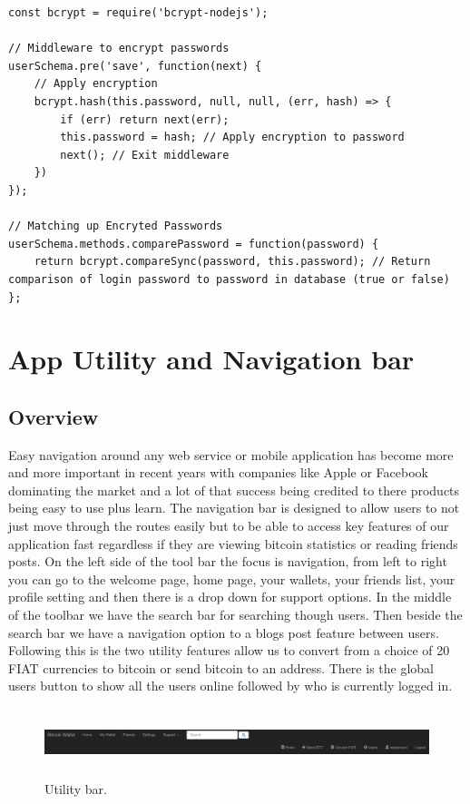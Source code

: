 \begin{lstlisting}
const bcrypt = require('bcrypt-nodejs');

// Middleware to encrypt passwords
userSchema.pre('save', function(next) {
    // Apply encryption
    bcrypt.hash(this.password, null, null, (err, hash) => {
        if (err) return next(err);
        this.password = hash; // Apply encryption to password
        next(); // Exit middleware
    })
});

// Matching up Encryted Passwords
userSchema.methods.comparePassword = function(password) {
    return bcrypt.compareSync(password, this.password); // Return comparison of login password to password in database (true or false)
};
\end{lstlisting}

\section{App Utility and Navigation bar}

\subsection{Overview}
Easy navigation around any web service or mobile application has become more and more important in recent years with companies like Apple or Facebook dominating the market and a lot of that success being credited to there products being easy to use plus learn. The navigation bar is designed to allow users to not just move through the routes easily but to be able to access key features of our application fast regardless if they are viewing bitcoin statistics or reading friends posts. On the left side of the tool bar the focus is navigation, from left to right you can go to the welcome page, home page, your wallets, your friends list, your profile setting and then there is a drop down for support options. In the middle of the toolbar we have the search bar for searching though users. Then beside the search bar we have a navigation option to a blogs post feature between users. Following this is the two utility features allow us to convert from a choice of 20 FIAT currencies to bitcoin or send bitcoin to an address. There is the global users button to show all the users online followed by who is currently logged in.

\begin{figure}[H]
\centering
\includegraphics[width=20cm, height=2cm]{img/ToolBar.png}
\caption{Utility bar.}
\end{figure}


